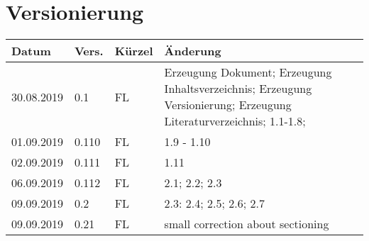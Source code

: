 \newpage
\tableofcontents

\section*{Versionierung}
\begin{tabular}{|p{2cm}|p{1cm}|p{1.5cm}|p{8.5cm}|}\hline
Datum & Vers. & Kürzel & Änderung \\ \hline
30.08.2019 & 0.1 & FL & Erzeugung Dokument; Erzeugung Inhaltsverzeichnis; Erzeugung Versionierung; Erzeugung Literaturverzeichnis; 1.1-1.8;\\ \hline
01.09.2019 & 0.110 & FL & 1.9 - 1.10 \\ \hline
02.09.2019 & 0.111 & FL & 1.11 \\ \hline
06.09.2019 & 0.112 & FL & 2.1; 2.2; 2.3 \\ \hline
09.09.2019 & 0.2 & FL & 2.3: 2.4; 2.5; 2.6; 2.7 \\ \hline
09.09.2019 & 0.21 & FL & small correction about sectioning \\ \hline
\end{tabular}
\listoffigures